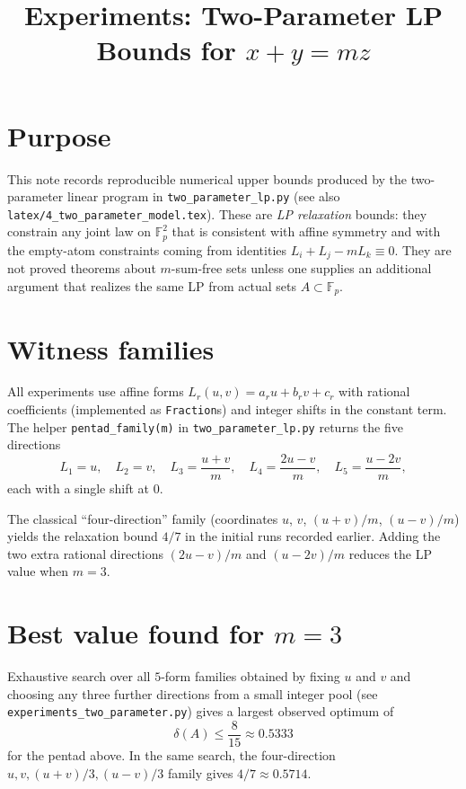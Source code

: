 \documentclass[11pt]{article}
\title{Experiments: Two-Parameter LP Bounds for $x+y=mz$}
\author{}
\date{}
\begin{document}
\maketitle

\section{Purpose}

This note records reproducible numerical upper bounds produced by the
two-parameter linear program in \texttt{two\_parameter\_lp.py} (see also
\texttt{latex/4\_two\_parameter\_model.tex}). These are \emph{LP relaxation}
bounds: they constrain any joint law on $\mathbb{F}_p^2$ that is consistent with
affine symmetry and with the empty-atom constraints coming from identities
$L_i+L_j-mL_k\equiv 0$. They are not proved theorems about $m$-sum-free sets
unless one supplies an additional argument that realizes the same LP from actual
sets $A\subset\mathbb{F}_p$.

\section{Witness families}

All experiments use affine forms $L_r(u,v)=a_r u+b_r v+c_r$ with rational
coefficients (implemented as \texttt{Fraction}s) and integer shifts in the
constant term. The helper \texttt{pentad\_family(m)} in
\texttt{two\_parameter\_lp.py} returns the five directions
\[
L_1=u,\quad L_2=v,\quad L_3=\frac{u+v}{m},\quad
L_4=\frac{2u-v}{m},\quad L_5=\frac{u-2v}{m},
\]
each with a single shift at $0$.

The classical ``four-direction'' family (coordinates $u$, $v$, $(u+v)/m$,
$(u-v)/m$) yields the relaxation bound $4/7$ in the initial runs recorded
earlier. Adding the two extra rational directions $(2u-v)/m$ and $(u-2v)/m$
reduces the LP value when $m=3$.

\section{Best value found for $m=3$}

Exhaustive search over all $5$-form families obtained by fixing $u$ and $v$ and
choosing any three further directions from a small integer pool (see
\texttt{experiments\_two\_parameter.py}) gives a largest observed optimum of
\[
\delta(A)\le \frac{8}{15}\approx 0.5333
\]
for the pentad above. In the same search, the four-direction
$u,v,(u+v)/3,(u-v)/3$ family gives $4/7\approx 0.5714$.
\end{document}
